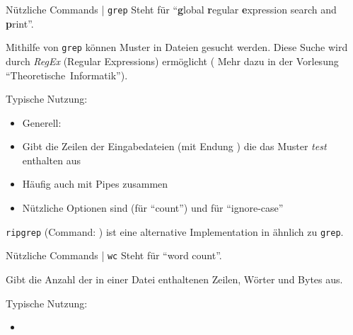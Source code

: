 \documentclass{setbeamer}
\begin{document}
\begin{frame}{Nützliche Commands | \texttt{grep}}
    Steht für ``\textbf{g}lobal \textbf{r}egular \textbf{e}xpression search and \textbf{p}rint''.

    \vspace{0.3cm}

    Mithilfe von \texttt{grep} können Muster in Dateien gesucht werden. Diese Suche wird durch \emph{RegEx} (Regular Expressions) ermöglicht ({\Large \MVRightarrow} Mehr dazu in der Vorlesung ``Theoretische~Informatik'').

    \vspace{0.3cm}


    Typische Nutzung:
    \begin{itemize}
        \item Generell: 
        \item {}\textemdash Gibt die Zeilen der Eingabedateien (mit Endung ) die das Muster \emph{test} enthalten aus
        \item {}\textemdash Häufig auch mit Pipes  zusammen
        \item Nützliche Optionen sind  (für ``count'') und  {für ``ignore-case''}
    \end{itemize}


    \vspace{0.3cm}

    \texttt{ripgrep} (Command: ) ist eine alternative Implementation in  ähnlich zu \texttt{grep}.
\end{frame}

\begin{frame}{Nützliche Commands | \texttt{wc}}
    Steht für ``word count''.

    \vspace{0.3cm}
    
    Gibt die Anzahl der in einer Datei enthaltenen Zeilen, Wörter und Bytes aus.

    \vspace{0.3cm}

    Typische Nutzung:
    \begin{itemize}
        \item {}
    \end{itemize}
\end{frame}
\end{document}

